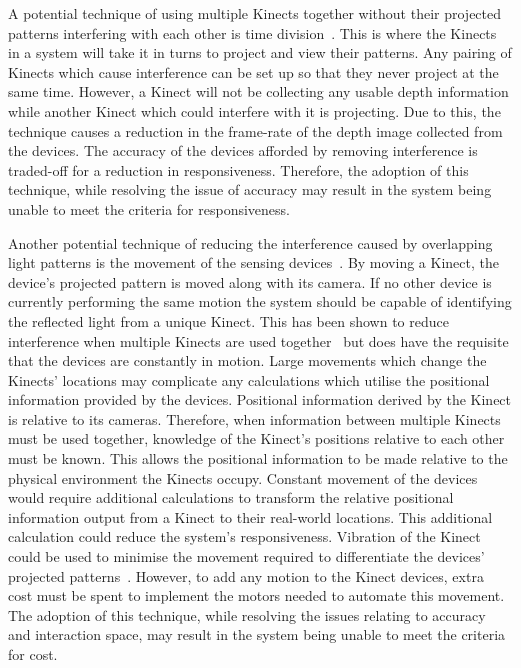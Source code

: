 \documentclass[link]{IWCOMP}
\begin{document}
A potential technique of using multiple Kinects together without their projected patterns interfering with each other is time division~\cite{Schroder2011}.
This is where the Kinects in a system will take it in turns to project and view their patterns.
Any pairing of Kinects which cause interference can be set up so that they never project at the same time.
However, a Kinect will not be collecting any usable depth information while another Kinect which could interfere with it is projecting.
Due to this,  the technique causes a reduction in the frame-rate of the depth image collected from the devices.
The accuracy of the devices afforded by removing interference is traded-off for a reduction in responsiveness.
Therefore, the adoption of this technique, while resolving the issue of accuracy may result in the system being unable to meet the criteria for responsiveness.

Another potential technique of reducing the interference caused by overlapping light patterns is the movement of the sensing devices~\cite{Maimone2012}.
By moving a Kinect, the device's projected pattern is moved along with its camera.
If no other device is currently performing the same motion the system should be capable of identifying the reflected light from a unique Kinect.
This has been shown to reduce interference when multiple Kinects are used together~\cite{Maimone2012} but does have the requisite that the devices are constantly in motion.
Large movements which change the Kinects' locations may complicate any calculations which utilise the positional information provided by the devices.
Positional information derived by the Kinect is relative to its cameras.
Therefore, when information between multiple Kinects must be used together, knowledge of the Kinect's positions relative to each other must be known.
This allows the positional information to be made relative to the physical environment the Kinects occupy.
Constant movement of the devices would require additional calculations to transform the relative positional information output from a Kinect to their real-world locations.
This additional calculation could reduce the system's responsiveness.
Vibration of the Kinect could be used to minimise the movement required to differentiate the devices' projected patterns~\cite{Kainz2012}.
However, to add any motion to the Kinect devices, extra cost must be spent to implement the motors needed to automate this movement.
The adoption of this technique, while resolving the issues relating to accuracy and interaction space, may result in the system being unable to meet the criteria for cost.
\end{document}
